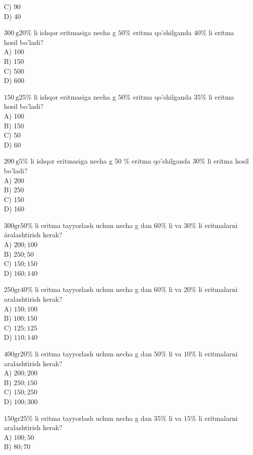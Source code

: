 C) 90\\
D) 40
  \item $300 \mathrm{~g} 20 \%$ li ishqor eritmasiga necha g $50 \%$ eritma qo'shilganda $40 \%$ li eritma hosil bo'ladi?\\
A) 100\\
B) 150\\
C) 500\\
D) 600
  \item $150 \mathrm{~g} 25 \%$ li ishqor eritmasiga necha g $50 \%$ eritma qo'shilganda $35 \%$ li eritma hosil bo'ladi?\\
A) 100\\
B) 150\\
C) 50\\
D) 60
  \item $200 \mathrm{~g} 5 \%$ li ishqor eritmasiga necha g 50 \% eritma qo'shilganda $30 \%$ li eritma hosil bo'ladi?\\
A) 200\\
B) 250\\
C) 150\\
D) 160
  \item $300 \mathrm{gr} 50 \%$ li eritma tayyorlash uchun necha g dan $60 \%$ li va $30 \%$ li eritmalarni áralashtirish kerak?\\
A) $200 ; 100$\\
B) $250 ; 50$\\
C) $150 ; 150$\\
D) $160 ; 140$
  \item $250 \mathrm{gr} 40 \%$ li eritma tayyorlash uchun necha g dan $60 \%$ li va $20 \%$ li eritmalarni aralashtirish kerak?\\
A) $150 ; 100$\\
B) $100 ; 150$\\
C) $125 ; 125$\\
D) $110 ; 140$
  \item $400 \mathrm{gr} 20 \%$ li eritma tayyorlash uchun necha g dan $50 \%$ li va $10 \%$ li eritmalarni aralashtirish kerak?\\
A) $200 ; 200$\\
B) $250 ; 150$\\
C) $150 ; 250$\\
D) $100 ; 300$
  \item $150 \mathrm{gr} 25 \%$ li eritma tayyorlash uchun necha g dan $35 \%$ li va $15 \%$ li eritmalarni aralashtirish kerak?\\
A) $100 ; 50$\\
B) $80 ; 70$\\
